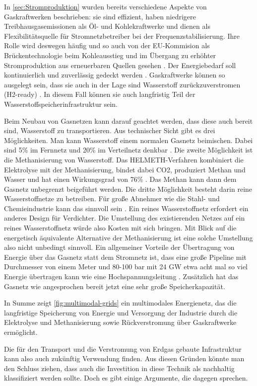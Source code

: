 In \autoref{sec:Stromproduktion} wurden bereits verschiedene Aspekte von Gaskraftwerken beschrieben: sie sind effizient, haben niedrigere Treibhausgasemissionen als Öl- und Kohlekraftwerke und dienen als Flexibilitätsquelle für Stromnetzbetreiber bei der Frequenzstabilisierung.
Ihre Rolle wird deswegen häufig und so auch von der EU-Kommision als Brückentechnologie beim Kohleausstieg und im Übergang zu erhöhter Stromproduktion aus erneuerbaren Quellen gesehen \cite{reuters, eu-komm}.
Der Energiebedarf soll kontinuierlich und zuverlässig gedeckt werden \cite{uba}.
Gaskraftwerke können so ausgelegt sein, dass sie auch in der Lage sind Wasserstoff zurückzuverstromen (H2-ready) \cite{rnd}. In diesem Fall können sie auch langfristig Teil der Wasserstoffspeicherinfrastruktur sein. 

Beim Neubau von Gasnetzen kann darauf geachtet werden, dass diese auch bereit sind, Wasserstoff zu transportieren. Aus technischer Sicht gibt es drei Möglichkeiten. Man kann Wasserstoff einem normalen Gasnetz beimischen. Dabei sind 5\% im Fernnetz und 20\% im Verteilnetz denkbar \cite{iis}. Die zweite Möglichkeit ist die Methanisierung von Wasserstoff. Das HELMETH-Verfahren kombiniert die Elektrolyse mit der Methanisierung, bindet dabei CO2, produziert Methan und Wasser und hat einen Wirkungsgrad von 76\% \cite{helmeth}. Das Methan kann dann dem Gasnetz unbegrenzt beigeführt werden. Die dritte Möglichkeit besteht darin reine Wasserstoffnetze zu betreiben. Für große Abnehmer wie die Stahl- und Chemieindustrie kann das sinnvoll sein \cite{iis}. Ein reines Wasserstoffnetz erfordert ein anderes Design für Verdichter. Die Umstellung des existierenden Netzes auf ein reines Wasserstoffnetz würde also Kosten mit sich bringen. Mit Blick auf die energetisch äquivalente Alternative der Methanisierung ist eine solche Umstellung also nicht unbedingt sinnvoll.
Ein allgemeiner Vorteile der Übertragung von Energie über das Gasnetz statt dem Stromnetz ist, dass eine große Pipeline mit Durchmesser von einem Meter und 80-100 bar mit 24 GW etwa acht mal so viel Energie übertragen kann wie eine Hochspannungsleitung \cite{iis}. Zusätzlich hat das Gasnetz wie angesprochen bereit jetzt eine sehr große Speicherkapazität.

In Summe zeigt \autoref{fig:multimodal-grids} ein multimodales Energienetz, das die langfristige Speicherung von Energie und Versorgung der Industrie durch die Elektrolyse und Methanisierung sowie Rückverstromung über Gaskraftwerke ermöglicht.

Die für den Transport und die Verstromung von Erdgas gebaute Infrastruktur kann also auch zukünftig Verwendung finden. Aus diesen Gründen könnte man den Schluss ziehen, dass auch die Investition in diese Technik als nachhaltig klassifiziert werden sollte. Doch es gibt einige Argumente, die dagegen sprechen.

